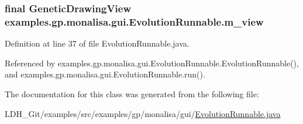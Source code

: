 \hypertarget{classexamples_1_1gp_1_1monalisa_1_1gui_1_1_evolution_runnable_ae7519fb327e79414e5aba05a38d35d8a}{
\subsubsection[{m\-\_\-view}]{\setlength{\rightskip}{0pt plus 5cm}final {\bf Genetic\-Drawing\-View} examples.\-gp.\-monalisa.\-gui.\-Evolution\-Runnable.\-m\-\_\-view\hspace{0.3cm}{\ttfamily [protected]}}}\label{classexamples_1_1gp_1_1monalisa_1_1gui_1_1_evolution_runnable_ae7519fb327e79414e5aba05a38d35d8a}


Definition at line 37 of file Evolution\-Runnable.\-java.



Referenced by examples.\-gp.\-monalisa.\-gui.\-Evolution\-Runnable.\-Evolution\-Runnable(), and examples.\-gp.\-monalisa.\-gui.\-Evolution\-Runnable.\-run().



The documentation for this class was generated from the following file\-:\begin{DoxyCompactItemize}
\item 
L\-D\-H\-\_\-\-Git/examples/src/examples/gp/monalisa/gui/\hyperlink{gp_2monalisa_2gui_2_evolution_runnable_8java}{Evolution\-Runnable.\-java}\end{DoxyCompactItemize}

